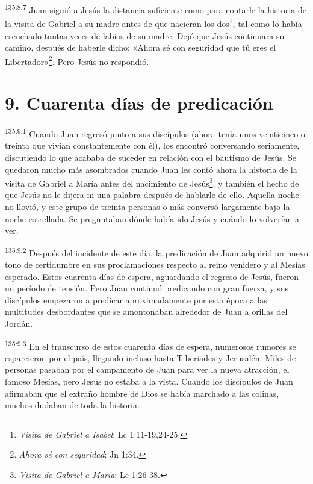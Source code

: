 \par
\textsuperscript{135:8.7} Juan siguió a Jesús la distancia suficiente como para contarle la historia de la visita de Gabriel a su madre antes de que nacieran los dos\footnote{\textit{Visita de Gabriel a Isabel}: Lc 1:11-19,24-25.}, tal como lo había escuchado tantas veces de labios de su madre. Dejó que Jesús continuara su camino, después de haberle dicho: «Ahora sé con seguridad que tú eres el Libertador»\footnote{\textit{Ahora sé con seguridad}: Jn 1:34.}. Pero Jesús no respondió.

\section*{9. Cuarenta días de predicación}
\par
\textsuperscript{135:9.1} Cuando Juan regresó junto a sus discípulos (ahora tenía unos veinticinco o treinta que vivían constantemente con él), los encontró conversando seriamente, discutiendo lo que acababa de suceder en relación con el bautismo de Jesús. Se quedaron mucho más asombrados cuando Juan les contó ahora la historia de la visita de Gabriel a María antes del nacimiento de Jesús\footnote{\textit{Visita de Gabriel a María}: Lc 1:26-38.}, y también el hecho de que Jesús no le dijera ni una palabra después de hablarle de ello. Aquella noche no llovió, y este grupo de treinta personas o más conversó largamente bajo la noche estrellada. Se preguntaban dónde había ido Jesús y cuándo lo volverían a ver.

\par
\textsuperscript{135:9.2} Después del incidente de este día, la predicación de Juan adquirió un nuevo tono de certidumbre en sus proclamaciones respecto al reino venidero y al Mesías esperado. Estos cuarenta días de espera, aguardando el regreso de Jesús, fueron un período de tensión. Pero Juan continuó predicando con gran fuerza, y sus discípulos empezaron a predicar aproximadamente por esta época a las multitudes desbordantes que se amontonaban alrededor de Juan a orillas del Jordán.

\par
\textsuperscript{135:9.3} En el transcurso de estos cuarenta días de espera, numerosos rumores se esparcieron por el país, llegando incluso hasta Tiberiades y Jerusalén. Miles de personas pasaban por el campamento de Juan para ver la nueva atracción, el famoso Mesías, pero Jesús no estaba a la vista. Cuando los discípulos de Juan afirmaban que el extraño hombre de Dios se había marchado a las colinas, muchos dudaban de toda la historia.

